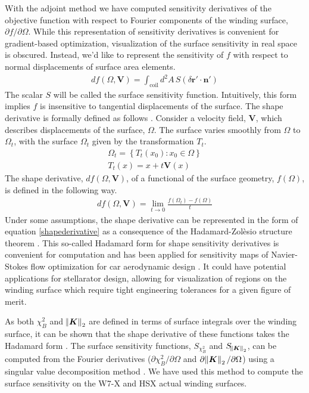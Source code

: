 \documentclass[aps,unsortedaddress]{revtex4-1}
\begin{document}
With the adjoint method we have computed sensitivity derivatives of the objective function with respect to Fourier components of the winding surface, $\partial f/\partial \Omega$. While this representation of sensitivity derivatives is convenient for gradient-based optimization, visualization of the surface sensitivity in real space is obscured. Instead, we'd like to represent the sensitivity of $f$ with respect to normal displacements of surface area elements. 
\begin{gather}
d f(\Omega,\bm{V}) = \int_{\text{coil}} d^2 A \, S \left( \delta \bm{r}' \cdot \bm{n}' \right)
\label{shapederivative}
\end{gather}
The scalar $S$ will be called the surface sensitivity function. Intuitively, this form implies $f$ is insensitive to tangential displacements of the surface. The shape derivative is formally defined as follows \cite{Delfour2011}. Consider a velocity field, $\bm{V}$, which describes displacements of the surface, $\Omega$. The surface varies smoothly from $\Omega$ to $\Omega_t$, with the surface $\Omega_t$ given by the transformation $T_t$.
\begin{gather}
\Omega_t = \left \{ T_t(x_0) : x_0 \in \Omega \right \} \\
T_t(x) = x + t \bm{V}(x)
\end{gather}
The shape derivative, $df(\Omega,\bm{V})$, of a functional of the surface geometry, $f(\Omega)$, is defined in the following way. 
\begin{gather}
d f(\Omega, \bm{V}) = \lim_{t \rightarrow 0} \frac{ f(\Omega_t) - f(\Omega)}{t}
\end{gather}
Under some assumptions, the shape derivative can be represented in the form of equation \ref{shapederivative} as a consequence of the Hadamard-Zol\`{e}sio structure theorem \cite{Delfour2011}. This so-called Hadamard form for shape sensitivity derivatives is convenient for computation and has been applied for sensitivity maps of Navier-Stokes flow optimization for car aerodynamic design \cite{Othmer2008,Othmer2014}. It could have potential applications for stellarator design, allowing for visualization of regions on the winding surface which require tight engineering tolerances for a given figure of merit. 

As both $\chi^2_B$ and $\norm{\bm{K}}_2$ are defined in terms of surface integrals over the winding surface, it can be shown that the shape derivative of these functions takes the Hadamard form \cite{Novotny2013}. The surface sensitivity functions, $S_{\chi^2_B}$ and $S_{\norm{\bm{K}}_2}$, can be computed from the Fourier derivatives ($\partial \chi^2_B/\partial \Omega$ and $\partial \norm{\bm{K}}_2/\partial \Omega$) using a singular value decomposition method \cite{Landreman2018}. We have used this method to compute the surface sensitivity on the W7-X and HSX actual winding surfaces.  
\end{document}
